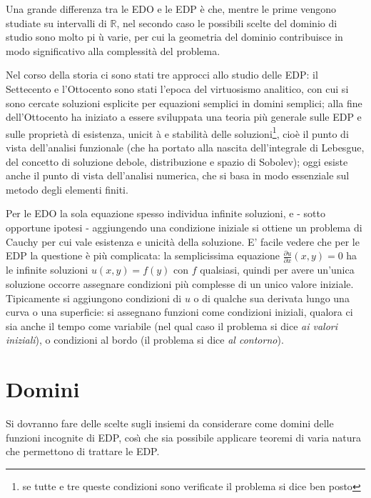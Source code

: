 \documentclass{article}
\begin{document}
Una grande differenza tra le EDO e le EDP \`{e} che, mentre le prime vengono
studiate su intervalli di $%
\mathbb{R}
$, nel secondo caso le possibili scelte del dominio di studio sono molto pi%
\`{u} varie, per cui la geometria del dominio contribuisce in modo
significativo alla complessit\`{a} del problema.

Nel corso della storia ci sono stati tre approcci allo studio delle EDP: il
Settecento e l'Ottocento sono stati l'epoca del virtuosismo analitico, con
cui si sono cercate soluzioni esplicite per equazioni semplici in domini
semplici; alla fine dell'Ottocento ha iniziato a essere sviluppata una
teoria pi\`{u} generale sulle EDP e sulle propriet\`{a} di esistenza, unicit%
\`{a} e stabilit\`{a} delle soluzioni\footnote{%
se tutte e tre queste condizioni sono verificate il problema si dice ben
posto}, cio\`{e} il punto di vista dell'analisi funzionale (che ha portato
alla nascita dell'integrale di Lebesgue, del concetto di soluzione debole,
distribuzione e spazio di Sobolev); oggi esiste anche il punto di vista
dell'analisi numerica, che si basa in modo essenziale sul metodo degli
elementi finiti.

Per le EDO la sola equazione spesso individua infinite soluzioni, e - sotto
opportune ipotesi - aggiungendo una condizione iniziale si ottiene un
problema di Cauchy per cui vale esistenza e unicit\`{a} della soluzione. E'
facile vedere che per le EDP la questione \`{e} pi\`{u} complicata: la
semplicissima equazione $\frac{\partial u}{\partial x}\left( x,y\right) =0$
ha le infinite soluzioni $u\left( x,y\right) =f\left( y\right) $ con $f$
qualsiasi, quindi per avere un'unica soluzione occorre assegnare condizioni
pi\`{u} complesse di un unico valore iniziale. Tipicamente si aggiungono
condizioni di $u$ o di qualche sua derivata lungo una curva o una
superficie: si assegnano funzioni come condizioni iniziali, qualora ci sia
anche il tempo come variabile (nel qual caso il problema si dice \textit{ai
valori iniziali}), o condizioni al bordo (il problema si dice \textit{al
contorno}).

\section{Domini}

Si dovranno fare delle scelte sugli insiemi da considerare come domini delle
funzioni incognite di EDP, cos\`{\i} che sia possibile applicare teoremi di
varia natura che permettono di trattare le EDP.
\end{document}
